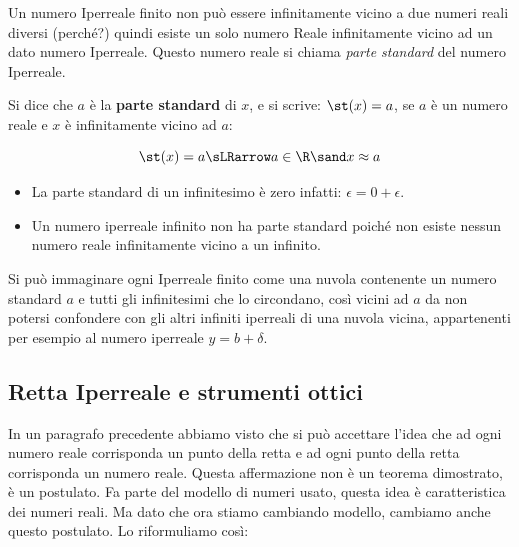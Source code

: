 Un numero Iperreale finito non può essere infinitamente vicino 
a due numeri reali diversi (perché?) quindi esiste un solo numero Reale 
infinitamente vicino ad un dato numero Iperreale. 
Questo numero reale si chiama \emph{parte standard} del numero Iperreale.

% 

\begin{definizione}
 Si dice che \(a\) è la \textbf{parte standard} di \(x\), e si scrive: 
 \(\st(x) = a\), se \(a\) è un numero reale e \(x\) è 
infinitamente vicino ad \(a\):

\[\st(x) = a \sLRarrow a \in \R \sand x \approx a\]
\end{definizione}

\begin{osservazione}
\begin{itemize} [nosep]
 \item 
La parte standard di un infinitesimo è zero infatti:
\(\epsilon = 0+\epsilon\).
 \item 
Un numero iperreale infinito non ha parte standard poiché non esiste nessun 
numero reale infinitamente vicino a un infinito.
\end{itemize}
\end{osservazione}

Si può immaginare ogni Iperreale finito come una
nuvola contenente un numero standard $a$ e tutti gli infinitesimi che lo 
circondano, così vicini ad $a$ da non potersi confondere con gli altri 
infiniti iperreali di una nuvola vicina, appartenenti per esempio al numero 
iperreale $y=b+\delta$. 



\subsection{Retta Iperreale e strumenti ottici}
\label{subsec:insnum_retta}

In un paragrafo precedente abbiamo visto che si può accettare l'idea che 
ad ogni numero reale corrisponda un punto della retta e ad ogni 
punto della retta corrisponda un numero reale. 
Questa affermazione non è un teorema dimostrato, è un postulato. 
Fa parte del modello di numeri usato, questa idea è caratteristica dei 
numeri reali. 
Ma dato che ora stiamo cambiando modello, cambiamo anche questo postulato. 
Lo riformuliamo così:

